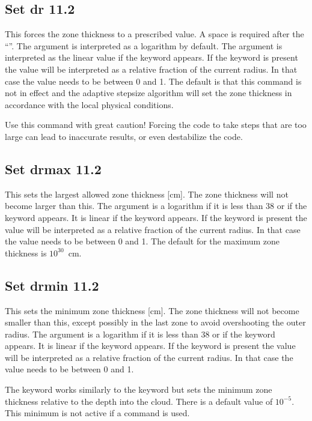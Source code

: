 \subsection{Set dr 11.2}

This forces the zone thickness to a prescribed value.
A space is required after the ``''.
The argument is interpreted as a logarithm by default.
The argument is interpreted as the linear value if the
keyword  appears.
If the keyword  is present the
value will be interpreted as a relative fraction of the current radius. In that
case the value needs to be between 0 and 1. The default is that this command
is not in effect and the adaptive stepsize algorithm will set the zone thickness
in accordance with the local physical conditions.

Use this command with great caution! Forcing the code to take steps that are too large
can lead to inaccurate results, or even destabilize the code.

\subsection{Set drmax 11.2}

This sets the largest allowed zone thickness [cm].
The zone thickness
will not become larger than this.
The argument is a logarithm
if it is less than 38 or if the keyword  appears.
It is linear if the keyword
 appears. If the keyword  is present the
value will be interpreted as a relative fraction of the current radius. In that
case the value needs to be between 0 and 1.
The default for the maximum zone thickness is $10^{30}$~cm.

\subsection{Set drmin 11.2}

This sets the minimum zone thickness [cm]. The zone thickness will not become
smaller than this, except possibly in the last zone to avoid overshooting the
outer radius. The argument is a logarithm if it is less than 38 or
if the keyword  appears. It is linear if the keyword
 appears. If the keyword  is present the
value will be interpreted as a relative fraction of the current radius. In that
case the value needs to be between 0 and 1.

The keyword  works similarly to the keyword 
but sets the minimum zone thickness relative to the depth into the cloud.  
There is a default value of $10^{-5}$.  This minimum is not active if a
 command is used. 

